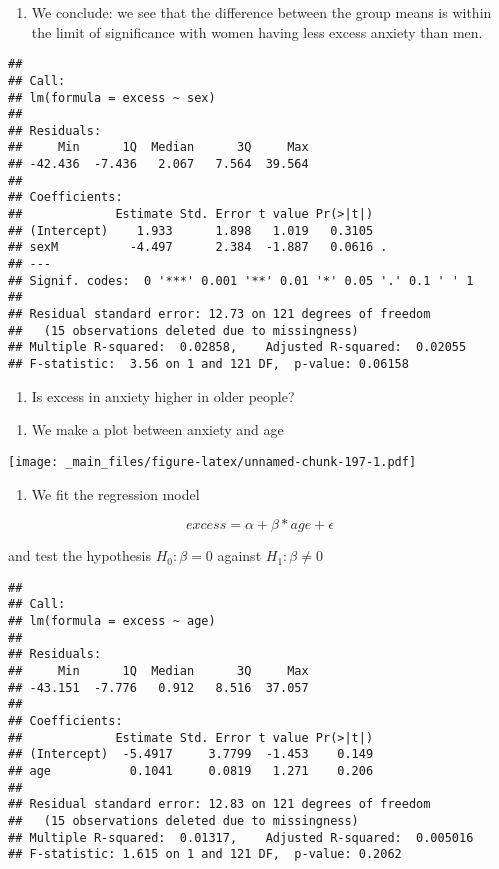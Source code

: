 \documentclass[
]{book}
\providecommand{\tightlist}{%
  \setlength{\itemsep}{0pt}\setlength{\parskip}{0pt}}
\begin{document}
\begin{enumerate}
\def\labelenumi{\alph{enumi}.}
\setcounter{enumi}{1}
\tightlist
\item
  We conclude: we see that the difference between the group means is within the limit of significance with women having less excess anxiety than men.
\end{enumerate}

\begin{verbatim}
## 
## Call:
## lm(formula = excess ~ sex)
## 
## Residuals:
##     Min      1Q  Median      3Q     Max 
## -42.436  -7.436   2.067   7.564  39.564 
## 
## Coefficients:
##             Estimate Std. Error t value Pr(>|t|)  
## (Intercept)    1.933      1.898   1.019   0.3105  
## sexM          -4.497      2.384  -1.887   0.0616 .
## ---
## Signif. codes:  0 '***' 0.001 '**' 0.01 '*' 0.05 '.' 0.1 ' ' 1
## 
## Residual standard error: 12.73 on 121 degrees of freedom
##   (15 observations deleted due to missingness)
## Multiple R-squared:  0.02858,    Adjusted R-squared:  0.02055 
## F-statistic:  3.56 on 1 and 121 DF,  p-value: 0.06158
\end{verbatim}

\begin{enumerate}
\def\labelenumi{\arabic{enumi}.}
\setcounter{enumi}{3}
\tightlist
\item
  Is excess in anxiety higher in older people?
\end{enumerate}

\begin{enumerate}
\def\labelenumi{\alph{enumi}.}
\tightlist
\item
  We make a plot between anxiety and age
\end{enumerate}

\texttt{[image: \_main\_files/figure-latex/unnamed-chunk-197-1.pdf]}

\begin{enumerate}
\def\labelenumi{\alph{enumi}.}
\setcounter{enumi}{1}
\tightlist
\item
  We fit the regression model
\end{enumerate}

\[excess = \alpha + \beta * age + \epsilon\]

and test the hypothesis \(H_0: \beta=0\) against \(H_1: \beta\neq 0\)

\begin{verbatim}
## 
## Call:
## lm(formula = excess ~ age)
## 
## Residuals:
##     Min      1Q  Median      3Q     Max 
## -43.151  -7.776   0.912   8.516  37.057 
## 
## Coefficients:
##             Estimate Std. Error t value Pr(>|t|)
## (Intercept)  -5.4917     3.7799  -1.453    0.149
## age           0.1041     0.0819   1.271    0.206
## 
## Residual standard error: 12.83 on 121 degrees of freedom
##   (15 observations deleted due to missingness)
## Multiple R-squared:  0.01317,    Adjusted R-squared:  0.005016 
## F-statistic: 1.615 on 1 and 121 DF,  p-value: 0.2062
\end{verbatim}
\end{document}
